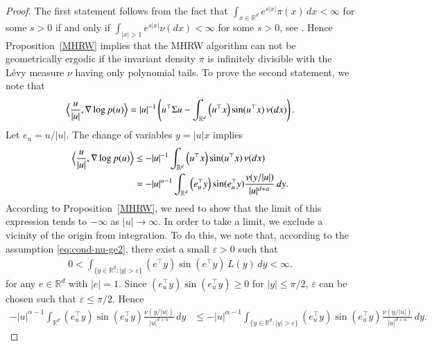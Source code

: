 \documentclass[preprint, 3p, authoryear]{elsarticle}
\providecommand{\eps}{\varepsilon}
\newcommand{\R}{\mathbb R}
\newcommand{\tcg}[1]{\textcolor{JungleGreen}{#1}}
\theoremstyle{definition}
\begin{document}
\begin{proof}
The first statement follows from the fact that \(\int_{x\in\R^d} e^{s|x|}\pi(x)\,dx<\infty\) for some $s>0$ if and only if \(\int_{|x|>1} e^{s|x|}\nu(dx)<\infty\) for some $s>0$, see \cite[Theorem 25.17]{sato1999}. 
Hence Proposition~\ref{MHRW} implies that the MHRW  algorithm can not be geometrically ergodic if the invariant density \(\pi\) is infinitely divisible with the L\'evy measure \(\nu\) having only polynomial tails. 
To prove the second statement, we note that 
\[
	\Bigl\langle \frac{u}{|u|} , \nabla\log p(u) \Bigr\rangle =  |u|^{-1} \left(u^\top\Sigma u-\int_{\mathbb{R}^{d}}\left(u^{\top}x\right)\sin(u^{\top}x)\,\nu(dx)\right).
\]
Let $e_u=u/|u|$. The change of variables $y = |u|x$ implies  
\begin{align*}
	\Bigl\langle \frac{u}{|u|} , \nabla\log p(u) \Bigr\rangle& \leq -|u|^{-1}\int_{\mathbb{R}^{d}}\left(u^{\top}x\right)\sin(u^{\top}x)\,\nu(dx)\\
 	&= -|u|^{\alpha-1}\int_{\R^d}\left(e_{u}^{\top}y\right)\sin(e_{u}^{\top}y)\frac{\nu(y/|u|)}{|u|^{d+\alpha}}\,dy.
\end{align*} 
According to Proposition~\ref{MHRW}, we need to show that the limit of this expression tends to $-\infty$ as $|u|\to \infty$.
In order to take a limit, we exclude a vicinity of the origin from integration. To do this, we note that, 
according to the assumption \eqref{eq:cond-nu-ge2}, there exist a small $\eps>0$ such that
\begin{align}
\label{eq:cond-nu-ge3}
	0<\int_{\{y\in\R^d: |y|>\eps\}}\left(e^{\top}y\right)\sin(e^{\top}y)\,L(y)\,dy<\infty.
\end{align} 
for any $e\in \mathbb{R}^d$ with $|e|=1.$
Since $\left(e_{u}^{\top}y\right)\sin(e_{u}^{\top}y)\ge0$ for $|y|\leq\pi/2$, $\eps$ can be chosen such that $\eps\leq\pi/2$. Hence
\begin{align*}	
	-|u|^{\alpha-1}\int_{\R^d}\left(e_{u}^{\top}y\right)\sin(e_{u}^{\top}y)\frac{\nu(y/|u|)}{|u|^{d+\alpha}}\,dy&\leq -|u|^{\alpha-1}\int_{\{y\in\R^d: |y|>\eps\}}\left(e_{u}^{\top}y\right)\sin(e_{u}^{\top}y)\frac{\nu(y/|u|)}{|u|^{d+\alpha}}\,dy.

\end{align*}
\end{proof}
\end{document}
